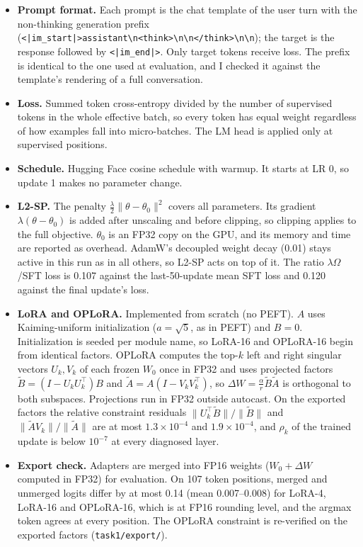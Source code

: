 \documentclass{article}
\begin{document}
\begin{itemize}
\item \textbf{Prompt format.} Each prompt is the chat template of the user turn with the non-thinking generation prefix (\texttt{<|im\_start|>assistant\textbackslash n<think>\textbackslash n\textbackslash n</think>\textbackslash n\textbackslash n}); the target is the response followed by \texttt{<|im\_end|>}. Only target tokens receive loss. The prefix is identical to the one used at evaluation, and I checked it against the template's rendering of a full conversation.
\item \textbf{Loss.} Summed token cross-entropy divided by the number of supervised tokens in the whole effective batch, so every token has equal weight regardless of how examples fall into micro-batches. The LM head is applied only at supervised positions.
\item \textbf{Schedule.} Hugging Face cosine schedule with warmup. It starts at LR 0, so update 1 makes no parameter change.
\item \textbf{L2-SP.} The penalty $\frac{\lambda}{2}\|\theta-\theta_0\|^2$ covers all parameters. Its gradient $\lambda(\theta-\theta_0)$ is added after unscaling and before clipping, so clipping applies to the full objective. $\theta_0$ is an FP32 copy on the GPU, and its memory and time are reported as overhead. AdamW's decoupled weight decay (0.01) stays active in this run as in all others, so L2-SP acts on top of it. The ratio $\lambda\Omega$/SFT loss is 0.107 against the last-50-update mean SFT loss and 0.120 against the final update's loss.
\item \textbf{LoRA and OPLoRA.} Implemented from scratch (no PEFT). $A$ uses Kaiming-uniform initialization ($a=\sqrt5$, as in PEFT) and $B=0$. Initialization is seeded per module name, so LoRA-16 and OPLoRA-16 begin from identical factors. OPLoRA computes the top-$k$ left and right singular vectors $U_k,V_k$ of each frozen $W_0$ once in FP32 and uses projected factors $\tilde B=(I-U_kU_k^\top)B$ and $\tilde A=A(I-V_kV_k^\top)$, so $\Delta W=\frac{\alpha}{r}\tilde B\tilde A$ is orthogonal to both subspaces. Projections run in FP32 outside autocast. On the exported factors the relative constraint residuals $\|U_k^\top\tilde B\|/\|\tilde B\|$ and $\|\tilde A V_k\|/\|\tilde A\|$ are at most $1.3\times10^{-4}$ and $1.9\times10^{-4}$, and $\rho_k$ of the trained update is below $10^{-7}$ at every diagnosed layer.
\item \textbf{Export check.} Adapters are merged into FP16 weights ($W_0+\Delta W$ computed in FP32) for evaluation. On 107 token positions, merged and unmerged logits differ by at most 0.14 (mean 0.007--0.008) for LoRA-4, LoRA-16 and OPLoRA-16, which is at FP16 rounding level, and the argmax token agrees at every position. The OPLoRA constraint is re-verified on the exported factors (\texttt{task1/export/}).

\end{itemize}
\end{document}
